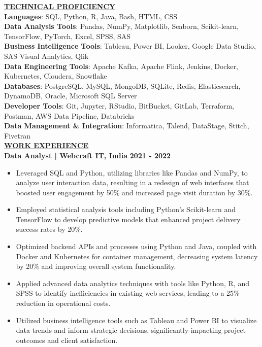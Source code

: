 \documentclass{article}
\begin{document}
\noindent \textbf{\underline{TECHNICAL PROFICIENCY}} \\
\textbf{Languages}{: \small SQL, Python, R, Java, Bash, HTML, CSS} \\
\textbf{Data Analysis Tools}{: \small Pandas, NumPy, Matplotlib, Seaborn, Scikit-learn, TensorFlow, PyTorch, Excel, SPSS, SAS} \\
\textbf{Business Intelligence Tools}{: \small Tableau, Power BI, Looker, Google Data Studio, SAS Visual Analytics, Qlik} \\
\textbf{Data Engineering Tools}{: \small Apache Kafka, Apache Flink, Jenkins, Docker, Kubernetes, Cloudera, Snowflake} \\
\textbf{Databases}{: \small PostgreSQL, MySQL, MongoDB, SQLite, Redis, Elasticsearch, DynamoDB, Oracle, Microsoft SQL Server} \\
\textbf{Developer Tools}{: \small Git, Jupyter, RStudio, BitBucket, GitLab, Terraform, Postman, AWS Data Pipeline, Databricks} \\
\textbf{Data Management \& Integration}{: \small Informatica, Talend, DataStage, Stitch, Fivetran} \\


\noindent \textbf{\underline{WORK EXPERIENCE}}\\
\noindent \textbf{Data Analyst | Webcraft IT, India} \hfill \textbf{2021 - 2022}
\begin{itemize}[noitemsep,nolistsep,leftmargin=*]
\item {\small Leveraged SQL and Python, utilizing libraries like Pandas and NumPy, to analyze user interaction data, resulting in a redesign of web interfaces that boosted user engagement by 50\% and increased page visit duration by 30\%.}
\item {\small Employed statistical analysis tools including Python's Scikit-learn and TensorFlow to develop predictive models that enhanced project delivery success rates by 20\%.}
\item {\small Optimized backend APIs and processes using Python and Java, coupled with Docker and Kubernetes for container management, decreasing system latency by 20\% and improving overall system functionality.}
\item {\small Applied advanced data analytics techniques with tools like Python, R, and SPSS to identify inefficiencies in existing web services, leading to a 25\% reduction in operational costs.}
\item {\small Utilized business intelligence tools such as Tableau and Power BI to visualize data trends and inform strategic decisions, significantly impacting project outcomes and client satisfaction.}\\
\end{itemize}
\end{document}
